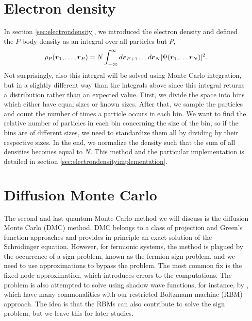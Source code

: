 \section{Electron density} \label{sec:electrondensityqmc}
In section \ref{sec:electrondensity}, we introduced the electron density and defined the $P$-body density as an integral over all particles but $P$,
\begin{equation}
\rho_P(\boldsymbol{{r}}_1,\hdots,\boldsymbol{{r}}_P)=N\int_{-\infty}^{\infty}d\boldsymbol{{r}}_{P+1}\hdots d\boldsymbol{{r}}_N |\Psi(\boldsymbol{{r}}_1,\hdots \boldsymbol{{r}}_N)|^2.
\end{equation}
Not surprisingly, also this integral will be solved using Monte Carlo integration, but in a slightly different way than the integrals above since this integral returns a distribution rather than an expected value. First, we divide the space into bins which either have equal sizes or known sizes. After that, we sample the particles and count the number of times a particle occurs in each bin. We want to find the relative number of particles in each bin concerning the size of the bin, so if the bins are of different sizes, we need to standardize them all by dividing by their respective sizes. In the end, we normalize the density such that the sum of all densities becomes equal to $N$. This method and the particular implementation is detailed in section \ref{sec:electrondensityimplementation}.

\section{Diffusion Monte Carlo} \label{sec:dmc}
The second and last quantum Monte Carlo method we will discuss is the diffusion Monte Carlo (DMC) method. DMC belongs to a class of projection and Green's function approaches and provides in principle an exact solution of the Schrödinger equation. However, for fermionic systems, the method is plagued by the occurrence of a sign-problem, known as the fermion sign problem, and we need to use approximations to bypass the problem. The most common fix is the fixed-node approximation, which introduces errors to the computations. The problem is also attempted to solve using shadow wave functions, for instance, by \citet{calcavecchia_sign_2014}, which have many commonalities with our restricted Boltzmann machine (RBM) approach. The idea is that the RBMs can also contribute to solve the sign problem, but we leave this for later studies. 

